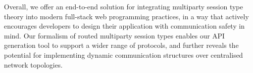 Overall, we offer an end-to-end solution for integrating
multiparty session type theory into modern full-stack web programming
practices, in a way that actively encourages developers to
design their application with communication safety in mind.
Our formalism of routed multiparty session types enables our
API generation tool to support a wider range of protocols, and
further reveals the potential
for implementing dynamic communication structures over centralised
network topologies.